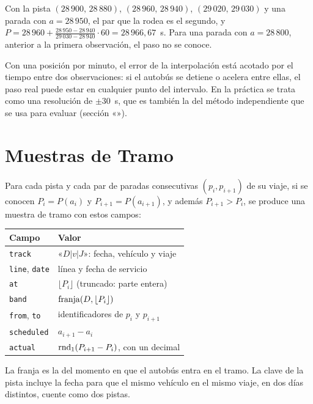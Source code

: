 \begin{ejemplo}
Con la pista $(28\,900,\,28\,880)$, $(28\,960,\,28\,940)$, $(29\,020,\,29\,030)$ y una parada con $a=28\,950$, el par que
la rodea es el segundo, y $P=28\,960+\frac{28\,950-28\,940}{29\,030-28\,940}\cdot60=28\,966{,}67$~s. Para una parada con
$a=28\,800$, anterior a la primera observación, el paso no se conoce.
\end{ejemplo}

Con una posición por minuto, el error de la interpolación está acotado por el tiempo entre dos
observaciones: si el autobús se detiene o acelera entre ellas, el paso real puede estar en cualquier punto del
intervalo. En la práctica se trata como una resolución de $\pm30$~s, que es también la del método independiente que se
usa para evaluar (sección «»).

\section{Muestras de Tramo}
\label{sec:muestras-tramo}

Para cada pista y cada par de paradas consecutivas $(p_i,p_{i+1})$ de su viaje, si se conocen $P_i=P(a_i)$ y
$P_{i+1}=P(a_{i+1})$, y además $P_{i+1}>P_i$, se produce una muestra de tramo con estos campos:
\begin{center}
\small
\begin{tabular}{@{}ll@{}}
\toprule
Campo & Valor\\
\midrule
\texttt{track} & «$D|v|J$»: fecha, vehículo y viaje\\
\texttt{line}, \texttt{date} & línea y fecha de servicio\\
\texttt{at} & $\lfloor P_i\rfloor$ (truncado: parte entera)\\
\texttt{band} & $\operatorname{franja}(D,\lfloor P_i\rfloor)$\\
\texttt{from}, \texttt{to} & identificadores de $p_i$ y $p_{i+1}$\\
\texttt{scheduled} & $a_{i+1}-a_i$\\
\texttt{actual} & $\operatorname{rnd}_1(P_{i+1}-P_i)$, con un decimal\\
\bottomrule
\end{tabular}
\end{center}

\noindent La franja es la del momento en que el autobús entra en el tramo. La clave de la pista incluye la fecha para que
el mismo vehículo en el mismo viaje, en dos días distintos, cuente como dos pistas.

